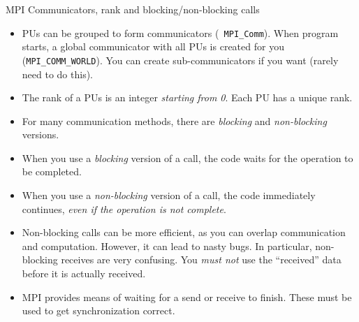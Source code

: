 \documentclass[aspectratio=169]{beamer}
\begin{document}
\begin{frame}{MPI Communicators, rank and blocking/non-blocking calls}
  \footnotesize%
  \begin{itemize}
  \item PUs can be grouped to form communicators ({\tt
      MPI\_Comm}). When program starts, a global communicator with all
    PUs is created for you ({\tt MPI\_COMM\_WORLD}). You can create
    sub-communicators if you want (rarely need to do this).
  \item The rank of a PUs is an integer \emph{starting from 0}. Each
    PU has a unique rank.
  \item For many communication methods, there are \emph{blocking} and
    \emph{non-blocking} versions.
  \item When you use a \emph{blocking} version of a call, the code waits
    for the operation to be completed.
  \item When you use a \emph{non-blocking} version of a call, the code
    immediately continues, \emph{even if the operation is not
      complete}.
  \item Non-blocking calls can be more efficient, as you can overlap
    communication and computation. However, it can lead to nasty
    bugs. In particular, non-blocking receives are very confusing. You
    \emph{must not} use the ``received'' data before it is actually
    received.
  \item MPI provides means of waiting for a send or receive to
    finish. These must be used to get synchronization correct.
  \end{itemize}
  
\end{frame}
\end{document}
